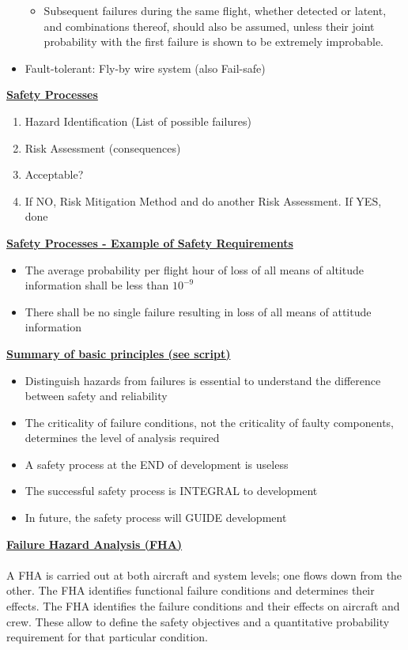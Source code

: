 \documentclass[9pt, landscape, fleqn]{scrartcl}
\begin{document}
\begin{multicols*}{3}
\begin{itemize}
\begin{itemize}
        \item Subsequent failures during the same flight, whether detected or latent, and combinations thereof, should also be assumed, unless their joint probability with the first failure is shown to be extremely improbable.
    \end{itemize}
    \item Fault-tolerant: Fly-by wire system (also Fail-safe)
\end{itemize}
\underline{\textbf{Safety Processes}}
\begin{enumerate}
    \item Hazard Identification (List of possible failures)
    \item Risk Assessment (consequences)
    \item Acceptable? 
    \item If NO, Risk Mitigation Method and do another Risk Assessment. If YES, done 
\end{enumerate}
\underline{\textbf{Safety Processes - Example of Safety Requirements}}
\begin{itemize}
    \item The average probability per flight hour of loss of all means of altitude information shall be less than $10^{-9}$
    \item There shall be no single failure resulting in loss of all means of attitude information 
\end{itemize}
\underline{\textbf{Summary of basic principles (see script)}}
\begin{itemize}
    \item Distinguish hazards from failures is essential to understand the difference between safety and reliability
    \item The criticality of failure conditions, not the criticality of faulty components, determines the level of analysis required 
    \item A safety process at the END of development is useless 
    \item The successful safety process is INTEGRAL to development 
    \item In future, the safety process will GUIDE development
\end{itemize}
\underline{\textbf{Failure Hazard Analysis (FHA)}} \\ \\ 
A FHA is carried out at both aircraft and system levels; one flows down from the other. The FHA identifies functional failure conditions and determines their effects. The FHA identifies the failure conditions and their effects on aircraft and crew. These allow to define the safety objectives and a quantitative probability requirement for that particular condition. \\ \\ 

\end{multicols*}
\end{document}
